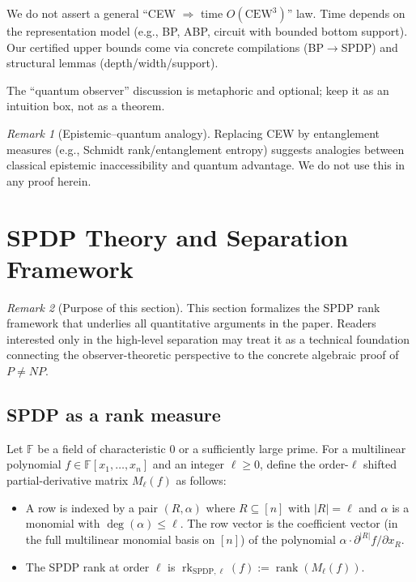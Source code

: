 \documentclass[12pt]{article}
\theoremstyle{definition}
\theoremstyle{definition}
\theoremstyle{remark}
\newtheorem{remark}{Remark}
\theoremstyle{remark}
\begin{document}
We do not assert a general ``CEW $\Rightarrow$ time $O(\mathrm{CEW}^3)$'' law. Time depends on the representation model (e.g., BP, ABP, circuit with bounded bottom support). Our certified upper bounds come via concrete compilations (BP$\to$SPDP) and structural lemmas (depth/width/support).

The ``quantum observer'' discussion is metaphoric and optional; keep it as an intuition box, not as a theorem.

\begin{remark}[Epistemic--quantum analogy]
Replacing CEW by entanglement measures (e.g., Schmidt rank/entanglement entropy) suggests analogies between classical epistemic inaccessibility and quantum advantage. We do not use this in any proof herein.
\end{remark}

\section{SPDP Theory and Separation Framework}
\label{sec:components}

\begin{remark}[Purpose of this section]
This section formalizes the SPDP rank framework that underlies all quantitative arguments in the paper. Readers interested only in the high-level separation may treat it as a technical foundation connecting the observer-theoretic perspective to the concrete algebraic proof of $P \neq NP$.
\end{remark}

\subsection{SPDP as a rank measure}

Let $\mathbb{F}$ be a field of characteristic $0$ or a sufficiently large prime. For a multilinear polynomial $f\in\mathbb{F}[x_1,\dots,x_n]$ and an integer $\ell\ge 0$, define the order-$\ell$ shifted partial-derivative matrix $M_\ell(f)$ as follows:

\begin{itemize}
\item A row is indexed by a pair $(R,\alpha)$ where $R\subseteq[n]$ with $|R|=\ell$ and $\alpha$ is a monomial with $\deg(\alpha)\le\ell$. The row vector is the coefficient vector (in the full multilinear monomial basis on $[n]$) of the polynomial $\alpha\cdot\partial^{|R|}f/\partial x_R$.

\item The SPDP rank at order $\ell$ is $\operatorname{rk}_{\mathrm{SPDP},\ell}(f):=\operatorname{rank}(M_\ell(f))$.
\end{itemize}
\end{document}
